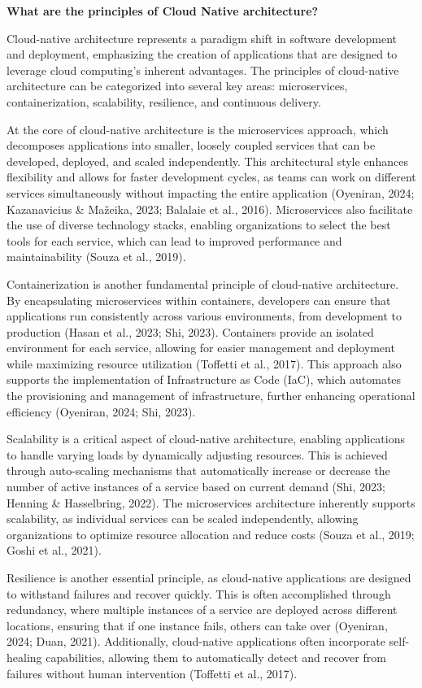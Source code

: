 \textbf{What are the principles of Cloud Native architecture?}

Cloud-native architecture represents a paradigm shift in software development and deployment, emphasizing the creation of applications that are designed to leverage cloud computing's inherent advantages. The principles of cloud-native architecture can be categorized into several key areas: microservices, containerization, scalability, resilience, and continuous delivery.

At the core of cloud-native architecture is the microservices approach, which decomposes applications into smaller, loosely coupled services that can be developed, deployed, and scaled independently. This architectural style enhances flexibility and allows for faster development cycles, as teams can work on different services simultaneously without impacting the entire application (Oyeniran, 2024; Kazanavicius & Mažeika, 2023; Balalaie et al., 2016). Microservices also facilitate the use of diverse technology stacks, enabling organizations to select the best tools for each service, which can lead to improved performance and maintainability (Souza et al., 2019).

Containerization is another fundamental principle of cloud-native architecture. By encapsulating microservices within containers, developers can ensure that applications run consistently across various environments, from development to production (Hasan et al., 2023; Shi, 2023). Containers provide an isolated environment for each service, allowing for easier management and deployment while maximizing resource utilization (Toffetti et al., 2017). This approach also supports the implementation of Infrastructure as Code (IaC), which automates the provisioning and management of infrastructure, further enhancing operational efficiency (Oyeniran, 2024; Shi, 2023).

Scalability is a critical aspect of cloud-native architecture, enabling applications to handle varying loads by dynamically adjusting resources. This is achieved through auto-scaling mechanisms that automatically increase or decrease the number of active instances of a service based on current demand (Shi, 2023; Henning & Hasselbring, 2022). The microservices architecture inherently supports scalability, as individual services can be scaled independently, allowing organizations to optimize resource allocation and reduce costs (Souza et al., 2019; Goshi et al., 2021).

Resilience is another essential principle, as cloud-native applications are designed to withstand failures and recover quickly. This is often accomplished through redundancy, where multiple instances of a service are deployed across different locations, ensuring that if one instance fails, others can take over (Oyeniran, 2024; Duan, 2021). Additionally, cloud-native applications often incorporate self-healing capabilities, allowing them to automatically detect and recover from failures without human intervention (Toffetti et al., 2017).


